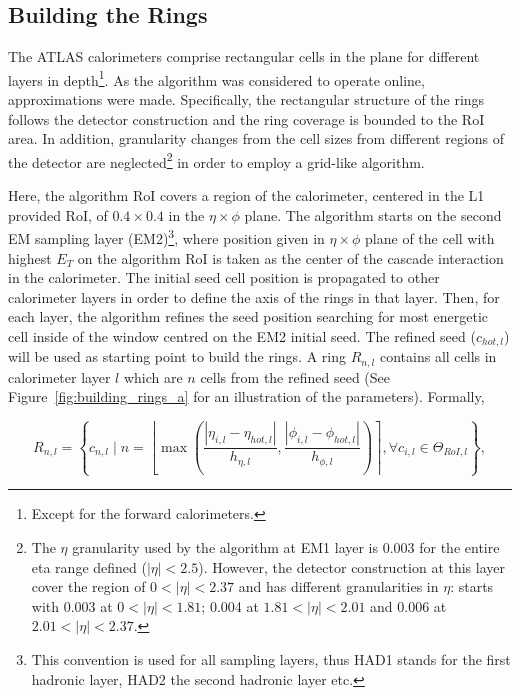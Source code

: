 \subsection{Building the Rings}\label{top:algorithm}

The ATLAS calorimeters comprise rectangular cells in the
\etaphi plane for different layers in depth\footnote{Except for the forward calorimeters.}.
As the algorithm was considered to operate online, approximations were made. Specifically, the rectangular structure of the rings follows the detector construction and the ring coverage is bounded to the RoI area. In addition, granularity changes from the cell sizes from different regions of the detector are neglected\footnote{The $\eta$ granularity used by the algorithm at EM1 layer is 0.003 for the entire eta range defined ($|\eta|<2.5$). However, the detector construction at this layer cover the region of $0<|\eta|<2.37$ and has different granularities in $\eta$: starts with 0.003 at $0<|\eta|<1.81$; 0.004 at $1.81<|\eta|<2.01$ and 0.006 at $2.01<|\eta|<2.37$.} in order to employ a grid-like algorithm.


Here, the algorithm RoI covers a
region of the calorimeter, centered in the L1 provided RoI, of
$0.4\times0.4$ in the $\eta\times\phi$ plane. The algorithm
starts on the second EM sampling layer (EM2)\footnote{This convention is used for all sampling layers, thus HAD1 stands for the first hadronic layer, HAD2 the second hadronic layer etc.}, where position given in $\eta\times\phi$ plane of the cell with
highest $E_T$ on the algorithm RoI is taken as the center of the cascade
interaction in the calorimeter. The initial seed cell position is propagated to other calorimeter layers in order to define the axis of the rings in that layer. Then, for each layer, the algorithm refines the seed position searching for most energetic cell inside of the window centred on the EM2 initial seed. The refined seed ($c_{hot,l}$) will be used as starting point to build the rings. A ring $R_{n,l}$ contains all cells in calorimeter layer $l$ which are $n$ cells from the refined seed (See Figure~\ref{fig:building_rings_a} for an illustration of the parameters). Formally,


\begin{equation}
R_{n,l} = \left\{c_{n,l} \mid n = \left\lfloor \max{\left( 
\frac{| \eta_{i,l} - \eta_{hot,l} |}{h_{\eta,l}}, 
\frac{| \phi_{i,l} - \phi_{hot,l} |}{h_{\phi,l}} 
\right)} \right\rceil, 
\forall c_{i,l} \in
\Theta_{RoI,l}
\right\},
\end{equation}



